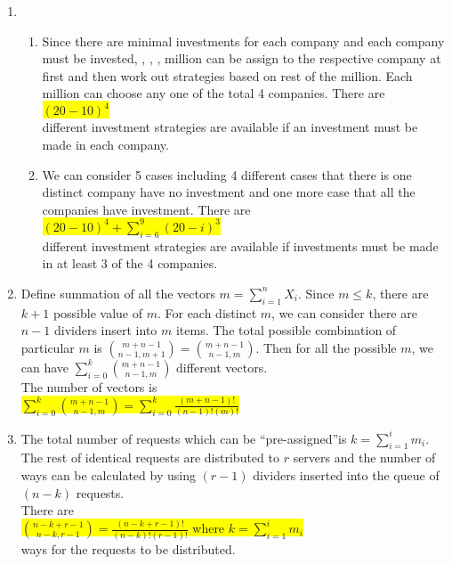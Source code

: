 \documentclass{article}
\begin{document}
\begin{enumerate}
\begin{enumerate}
		
	\end{enumerate}
	\item
	\begin{enumerate}
		\item
		\mysolu
		Since there are minimal investments for each company and each company must be invested, , , ,  million can be assign to the respective company at first and then work out strategies based on rest of the  million. Each  million can choose any one of the total 4 companies.
		\myansw
		There are\\
		\colorbox{yellow}{
			${(20-10)^{4}}$
		}\\
		different investment strategies are available if an investment must be made in each company.\\
		
		\item 
		\mysolu
		We can consider 5 cases including 4 different cases that there is one distinct company have no investment and one more case that all the companies have investment.
		\myansw
		There are\\
		\colorbox{yellow}{
			${(20-10)^{4}+\sum\limits_{i=6}^9(20-i)^3}$
		}\\
		different investment strategies are available if investments must be made in at least 3 of the 4 companies.\\
		
		
		 
	\end{enumerate}
	\item

		\mysolu
		Define summation of all the vectors ${m=\sum\limits_{i=1}^nX_i}$. Since ${m\leq{k}}$, there are ${k+1}$ possible value of ${m}$. For each distinct ${m}$, we can consider there are ${n-1}$ dividers insert into ${m}$ items. The total possible combination of particular ${m}$ is ${{m+n-1\choose n-1,m+1}={ m+n-1 \choose n-1,m}}$. Then for all the possible ${m}$, we can have ${\sum\limits_{i=0}^k{ m+n-1 \choose n-1,m}}$ different vectors.\\
		\myansw
		The number of vectors is\\
		\colorbox{yellow}{
			${\sum\limits_{i=0}^k{ m+n-1 \choose n-1,m}=\sum\limits_{i=0}^k \frac{(m+n-1)!}{(n-1)!(m)!}}$
		}\\
		

	\item

		\mysolu
		The total number of requests which can be \textquotedblleft pre-assigned\textquotedblright is ${k = \sum\limits_{i=1}^i m_i}$. The rest of identical requests are distributed to ${r}$ servers and the number of ways can be calculated by using ${(r-1)}$ dividers inserted into the queue of ${(n-k)}$ requests.\\
		\myansw
		There are\\
		\colorbox{yellow}{
			${{n-k+r-1 \choose n-k,r-1}=\frac{(n-k+r-1)!}{(n-k)!(r-1)!}}$ where ${k = \sum\limits_{i=1}^i m_i}$
		}\\
		ways for the requests to be distributed.\\




\end{enumerate}
\end{document}
